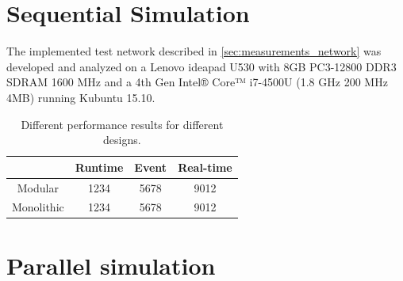 \section{Sequential Simulation}
\label{sec:measurements_sequential}
The implemented test network described in \ref{sec:measurements_network} was developed and analyzed on a Lenovo ideapad U530 with 8GB PC3-12800 DDR3 SDRAM 1600 MHz and a 4th Gen Intel® Core™ i7-4500U (1.8 GHz 200 MHz 4MB) running Kubuntu 15.10.
\cite{lenovo_spec}


\begin{table}
    \centering
    \begin{tabular}{c||c|c|c}
        & Runtime & Event & Real-time \\
        \hline \hline
         Modular & 1234 & 5678 & 9012 \\ 
        \hline Monolithic & 1234 & 5678 & 9012  \\  
    \end{tabular}
    \label{tab:measurements_design_seq}
    \caption{Different performance results for different designs.}
    
\end{table}

\section{Parallel simulation}
\label{sec:measurements_parallel}